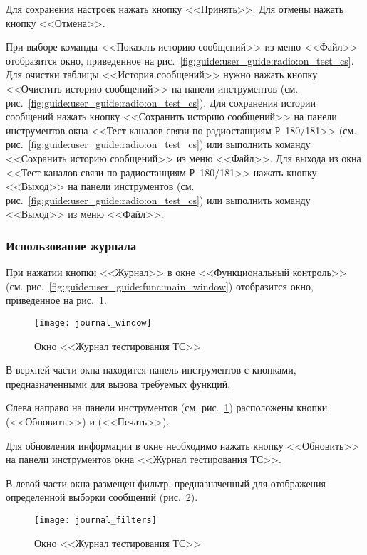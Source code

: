 Для сохранения настроек нажать кнопку <<Принять>>. Для отмены нажать кнопку <<Отмена>>.

При выборе команды <<Показать историю сообщений>> из меню <<Файл>> отобразится окно, приведенное на
рис.~\ref{fig:guide:user_guide:radio:on_test_cs}.
Для очистки таблицы <<История сообщений>> нужно нажать кнопку <<Очистить историю сообщений>> на панели инструментов (см.
рис.~\ref{fig:guide:user_guide:radio:on_test_cs}).
Для сохранения истории сообщений нажать кнопку <<Сохранить историю сообщений>> на панели инструментов окна <<Тест
каналов связи по радиостанциям Р–180/181>> (см. рис.~\ref{fig:guide:user_guide:radio:on_test_cs})  или выполнить команду
<<Сохранить историю сообщений>> из меню <<Файл>>.
Для выхода из окна <<Тест каналов связи по радиостанциям Р–180/181>> нажать кнопку <<Выход>> на панели инструментов (см.
рис.~\ref{fig:guide:user_guide:radio:on_test_cs}) или выполнить команду <<Выход>> из меню <<Файл>>.

\subsubsection{Использование журнала}
\label{sub:guide:user_guide:journal}
При нажатии кнопки <<Журнал>> в окне <<Функциональный контроль>>
(см. рис.~\ref{fig:guide:user_guide:func:main_window}) отобразится окно, приведенное на
рис.~\ref{fig:guide:user_guide:journal:journal_window}.

\begin{figure}[htb]
	\centering
	\texttt{[image: journal\_window]}
	\caption{Окно <<Журнал тестирования ТС>>}
	\label{fig:guide:user_guide:journal:journal_window}
\end{figure}

В верхней части окна находится панель инструментов с кнопками, предназначенными для вызова требуемых функций.

Cлева направо на панели инструментов (см. рис.~\ref{fig:guide:user_guide:journal:journal_window}) расположены кнопки
(<<Обновить>>) и (<<Печать>>).

Для обновления информации в окне необходимо нажать кнопку <<Обновить>> на панели инструментов окна <<Журнал тестирования
ТС>>.

В левой части окна размещен фильтр, предназначенный для отображения определенной выборки сообщений
(рис.~\ref{fig:guide:user_guide:journal:journal_filters}).

\begin{figure}[!htb]
	\centering
	\texttt{[image: journal\_filters]}
	\caption{Окно <<Журнал тестирования ТС>>}
	\label{fig:guide:user_guide:journal:journal_filters}
\end{figure}

